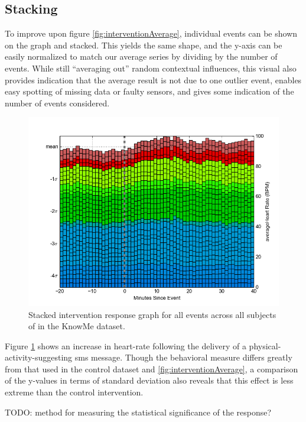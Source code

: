 \documentclass[preprint,journal]{vgtc}       %
\begin{document}
\subsection{Stacking}
To improve upon figure \ref{fig:interventionAverage}, individual events can be shown on the graph and stacked. This yields the same shape, and the y-axis can be easily normalized to match our average series by dividing by the number of events.
While still “averaging out” random contextual influences, this visual also provides indication that the average result is not due to one outlier event, enables easy spotting of missing data or faulty sensors, and gives some indication of the number of events considered.

\begin{figure}
\centering
\includegraphics[width=0.9\columnwidth]{./img/knowMe_sms_intervention.png}
\caption{Stacked intervention response graph for all events across all subjects of in the KnowMe dataset.}
\label{fig:knowMe_stacked}
\end{figure}

Figure \ref{fig:knowMe_stacked} shows an increase in heart-rate following the delivery of a physical-activity-suggesting sms message. Though the behavioral measure differs greatly from that used in the control dataset and \ref{fig:interventionAverage}, a comparison of the y-values in terms of standard deviation also reveals that this effect is less extreme than the control intervention. 

TODO: method for measuring the statistical significance of the response?
\end{document}
